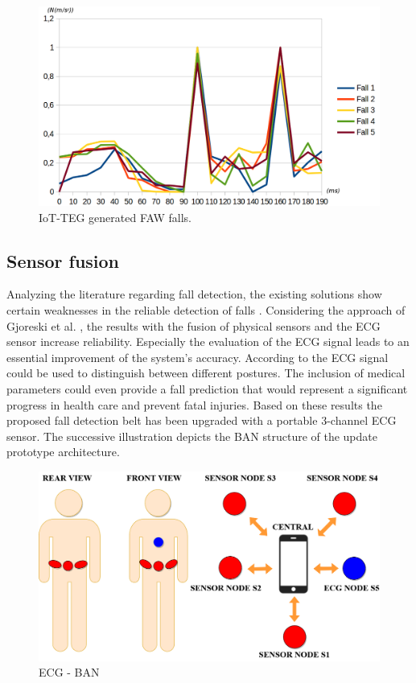\documentclass[10pt,journal,compsoc]{IEEEtran}
\begin{document}
\begin{figure}[!ht]
	\centering
	\includegraphics[scale=0.2]{Images/IoTTEGFAWGeneratedEvents}
	\caption[IoT-TEG generated FAW falls]{IoT-TEG generated FAW falls.}
	\label{fig:IoTTEGFAWGeneratedEvents}
\end{figure}

\subsection{Sensor fusion}
\label{subsec:sensorfusion}	
Analyzing the literature regarding fall detection, the existing solutions show certain weaknesses in the reliable detection of falls \cite{Igual2013, Li2009, Luder2009, Pannurat2014, jamsa2014fall}. Considering the approach of Gjoreski et al. \cite{Gjoreski2014}, the results with the fusion of physical sensors and the ECG sensor increase reliability. Especially the evaluation of the ECG signal leads to an essential improvement of the system's accuracy.  According to \cite{Gjoreski2014} the ECG signal could be used to distinguish between different postures. The inclusion of medical parameters could even provide a fall prediction that would represent a significant progress in health care and prevent fatal injuries. Based on these results the proposed fall detection belt has been upgraded with a portable 3-channel ECG sensor. The successive illustration depicts the BAN structure of the update prototype architecture.
\begin{figure}[!ht]
	\centering
	\includegraphics[scale=0.17]{Images/ECG-BAN.png}
	\caption[ECG - BAN]{ECG - BAN}
	\label{fig:ECGBAN}
\end{figure}
\end{document}
